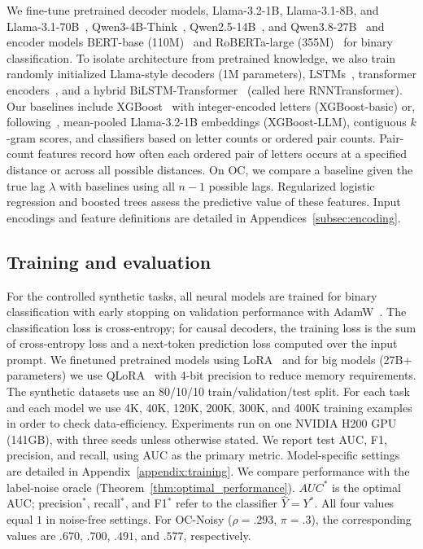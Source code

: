\documentclass{article} %
\theoremstyle{plain}
\theoremstyle{definition}
\theoremstyle{remark}
\begin{document}
We fine-tune pretrained decoder models, Llama-3.2-1B, Llama-3.1-8B, and Llama-3.1-70B~\citep{touvron2023llama,grattafiori2024llama3}, Qwen3-4B-Think~\citep{bai2023qwen}, Qwen2.5-14B~\citep{qwen2.5,qwen2}, and Qwen3.8-27B~\citep{qwen38} and encoder models BERT-base (110M)~\citep{devlin2019bert} and RoBERTa-large (355M)~\citep{liu2019robertarobustlyoptimizedbert} for binary classification. To isolate architecture from pretrained knowledge, we also train randomly initialized Llama-style decoders (1M parameters), LSTMs~\citep{hochreiter1997lstm}, transformer encoders~\citep{vaswani2017attention}, and a hybrid BiLSTM-Transformer~\citep{graves2005bilstm} (called here RNNTransformer). Our baselines include XGBoost~\citep{chen2016xgboost} with integer-encoded letters (XGBoost-basic) or, following~\citet{XGBoost_LLMs,XGBoost_LLMs_HF}, mean-pooled Llama-3.2-1B embeddings (XGBoost-LLM), contiguous $k$-gram scores, and classifiers based on letter counts or ordered pair counts. Pair-count features record how often each ordered pair of letters occurs at a specified distance or across all possible distances. On OC, we compare a baseline given the true lag $\lambda$ with baselines using all $n-1$ possible lags. Regularized logistic regression and boosted trees assess the predictive value of these features. Input encodings and feature definitions are detailed in Appendices~\ref{subsec:encoding}.

\subsection{Training and evaluation}
\label{subsec:training}
\label{subsec:evaluation}

For the controlled synthetic tasks, all neural models are trained for binary classification with early stopping on validation performance with AdamW~\citep{AdamW}. The classification loss is cross-entropy; for causal decoders, the training loss is the sum of cross-entropy loss and a next-token prediction loss computed over the input prompt. We finetuned pretrained models using LoRA~\citep{LoRA} and for big models (27B+ parameters) we use QLoRA~\citep{qlora} with 4-bit precision to reduce memory requirements. The synthetic datasets use an 80/10/10 train/validation/test split. For each task and each model we use 4K, 40K, 120K, 200K, 300K, and 400K training examples in order to check data-efficiency. Experiments run on one NVIDIA H200 GPU (141GB), with three seeds unless otherwise stated. We report test AUC, F1, precision, and recall, using AUC as the primary metric. Model-specific settings are detailed in Appendix~\ref{appendix:training}. We compare performance with the label-noise oracle
(Theorem~\ref{thm:optimal_performance}). $AUC^*$ is the optimal AUC; precision$^*$, recall$^*$, and F1$^*$ refer to the classifier $\hat{Y}=Y^*$. All four values equal $1$ in noise-free settings. For OC-Noisy ($\rho=.293$, $\pi=.3$), the corresponding values are $.670$, $.700$, $.491$, and $.577$, respectively.
\end{document}
